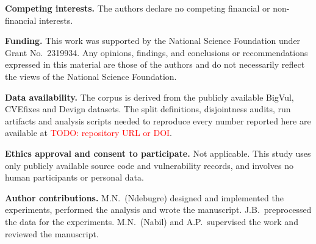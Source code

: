 \backmatter


\textbf{Competing interests.} The authors declare no competing financial or
non-financial interests.

\textbf{Funding.} This work was supported by the National Science Foundation
under Grant No.\ 2319934. Any opinions, findings,
and conclusions or recommendations expressed in this material are those of the
authors and do not necessarily reflect the views of the National Science
Foundation.

\textbf{Data availability.} The corpus is derived from the publicly available
BigVul, CVEfixes and Devign datasets. The split definitions, disjointness
audits, run artifacts and analysis scripts needed to reproduce every number
reported here are available at \textcolor{red}{TODO: repository URL or DOI}.

\textbf{Ethics approval and consent to participate.} Not applicable. This study
uses only publicly available source code and vulnerability records, and involves
no human participants or personal data.

\textbf{Author contributions.} M.N.\ (Ndebugre) designed and implemented the
experiments, performed the analysis and wrote the manuscript. J.B.\ preprocessed
the data for the experiments. M.N.\ (Nabil) and A.P.\ supervised the work and
reviewed the manuscript.

